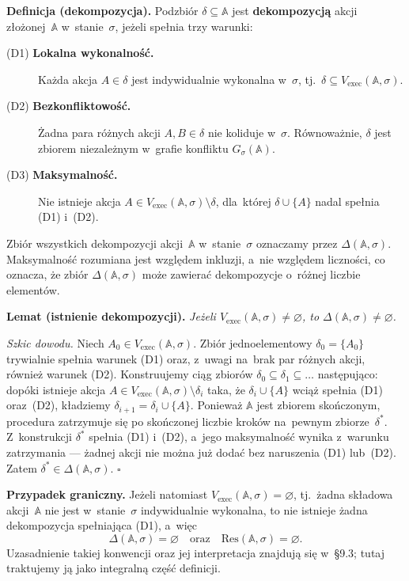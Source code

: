 \documentclass[11pt,a4paper]{article}
\theoremstyle{definition}
\begin{document}
\medskip
\noindent \textbf{Definicja (dekompozycja).}
Podzbiór $\delta \subseteq \mathbb{A}$ jest \textbf{dekompozycją} akcji
złożonej~$\mathbb{A}$ w~stanie~$\sigma$, jeżeli spełnia trzy warunki:
\begin{description}
  \item[(D1) \textbf{Lokalna wykonalność.}]
        Każda akcja $A \in \delta$ jest indywidualnie wykonalna w~$\sigma$,
        tj.\ $\delta \subseteq V_{\mathrm{exec}}(\mathbb{A},\sigma)$.
  \item[(D2) \textbf{Bezkonfliktowość.}]
        Żadna para różnych akcji $A, B \in \delta$ nie koliduje w~$\sigma$.
        Równoważnie, $\delta$ jest zbiorem niezależnym w~grafie konfliktu
        $G_\sigma(\mathbb{A})$.
  \item[(D3) \textbf{Maksymalność.}]
        Nie istnieje akcja $A \in V_{\mathrm{exec}}(\mathbb{A},\sigma) \setminus \delta$,
        dla~której $\delta \cup \{A\}$ nadal spełnia (D1) i~(D2).
\end{description}
Zbiór wszystkich dekompozycji akcji~$\mathbb{A}$ w~stanie~$\sigma$
oznaczamy przez $\Delta(\mathbb{A},\sigma)$. Maksymalność rozumiana jest
względem inkluzji, a~nie względem liczności, co oznacza, że zbiór
$\Delta(\mathbb{A},\sigma)$ może zawierać dekompozycje o~różnej liczbie
elementów.

\medskip
\noindent \textbf{Lemat (istnienie dekompozycji).}
\emph{Jeżeli $V_{\mathrm{exec}}(\mathbb{A},\sigma) \neq \varnothing$, to
$\Delta(\mathbb{A},\sigma) \neq \varnothing$.}

\medskip
\noindent \textit{Szkic dowodu.}
Niech $A_0 \in V_{\mathrm{exec}}(\mathbb{A},\sigma)$. Zbiór jednoelementowy
$\delta_0 = \{A_0\}$ trywialnie spełnia warunek (D1) oraz, z~uwagi na~brak
par różnych akcji, również warunek (D2). Konstruujemy ciąg zbiorów
$\delta_0 \subseteq \delta_1 \subseteq \ldots$ następująco: dopóki
istnieje akcja $A \in V_{\mathrm{exec}}(\mathbb{A},\sigma) \setminus \delta_i$
taka, że $\delta_i \cup \{A\}$ wciąż spełnia (D1) oraz~(D2), kładziemy
$\delta_{i+1} = \delta_i \cup \{A\}$. Ponieważ $\mathbb{A}$ jest zbiorem
skończonym, procedura zatrzymuje się po skończonej liczbie kroków
na~pewnym zbiorze~$\delta^\ast$. Z~konstrukcji $\delta^\ast$ spełnia
(D1) i~(D2), a~jego maksymalność wynika z~warunku zatrzymania ---
żadnej akcji nie można już dodać bez naruszenia (D1) lub~(D2). Zatem
$\delta^\ast \in \Delta(\mathbb{A},\sigma)$. \hfill$\square$

\medskip
\noindent \textbf{Przypadek graniczny.}
Jeżeli natomiast $V_{\mathrm{exec}}(\mathbb{A},\sigma) = \varnothing$,
tj.\ żadna składowa akcji~$\mathbb{A}$ nie jest w~stanie~$\sigma$
indywidualnie wykonalna, to nie istnieje żadna dekompozycja spełniająca
(D1), a~więc
\[
  \Delta(\mathbb{A},\sigma) = \varnothing
  \quad\text{oraz}\quad
  \mathrm{Res}(\mathbb{A},\sigma) = \varnothing.
\]
Uzasadnienie takiej konwencji oraz jej interpretacja znajdują się
w~\S9.3; tutaj traktujemy ją jako integralną część definicji.
\end{document}
